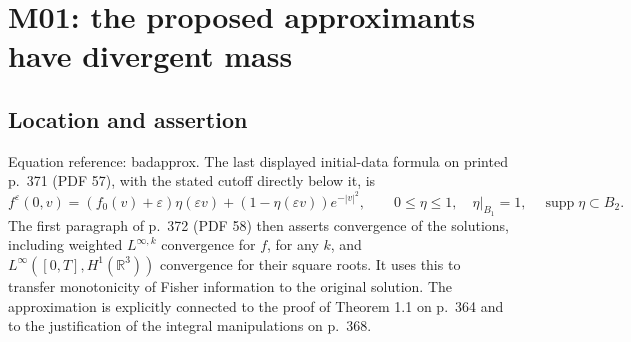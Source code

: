 \documentclass[10pt]{article}
\begin{document}
\section*{M01: the proposed approximants have divergent mass}
\subsection*{Location and assertion}
Equation reference: badapprox. The last displayed initial-data formula on printed p. 371 (PDF 57), with the stated cutoff directly below it, is \[
 f^\varepsilon(0,v)
 =(f_0(v)+\varepsilon)\eta(\varepsilon v)
 +(1-\eta(\varepsilon v))e^{-|v|^2},
 \qquad
 0\leq\eta\leq1,\quad
 \eta|_{B_1}=1,\quad
 \operatorname{supp}\eta\subset B_2.\] The first paragraph of p. 372 (PDF 58) then asserts convergence of the solutions, including weighted \(L^{\infty,k}\) convergence for \(f\), for any \(k\), and \(L^\infty([0,T],H^1(\mathbb R^3))\) convergence for their square roots. It uses this to transfer monotonicity of Fisher information to the original solution. The approximation is explicitly connected to the proof of Theorem 1.1 on p. 364 and to the justification of the integral manipulations on p. 368.\par
\end{document}
